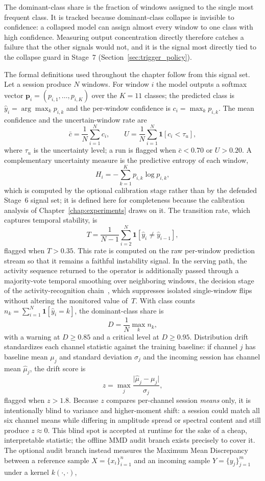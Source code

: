 The dominant-class share is the fraction of windows assigned to the single most frequent class. It is tracked because dominant-class collapse is invisible to confidence: a collapsed model can assign almost every window to one class with high confidence. Measuring output concentration directly therefore catches a failure that the other signals would not, and it is the signal most directly tied to the collapse guard in Stage~7 (Section~\ref{sec:trigger_policy}).

The formal definitions used throughout the chapter follow from this signal set. Let a session produce $N$ windows. For window $i$ the model outputs a softmax vector $\mathbf{p}_i=(p_{i,1},\dots,p_{i,K})$ over the $K=11$ classes; the predicted class is $\hat{y}_i=\arg\max_k p_{i,k}$ and the per-window confidence is $c_i=\max_k p_{i,k}$. The mean confidence and the uncertain-window rate are
\[
\bar{c}=\frac{1}{N}\sum_{i=1}^{N}c_i,
\qquad
U=\frac{1}{N}\sum_{i=1}^{N}\mathbf{1}\!\left[c_i<\tau_u\right],
\]
where $\tau_u$ is the uncertainty level; a run is flagged when $\bar{c}<0.70$ or $U>0.20$. A complementary uncertainty measure is the predictive entropy of each window,
\[
H_i=-\sum_{k=1}^{K}p_{i,k}\log p_{i,k},
\]
which is computed by the optional calibration stage rather than by the defended Stage~6 signal set; it is defined here for completeness because the calibration analysis of Chapter~\ref{chap:experiments} draws on it. The transition rate, which captures temporal stability, is
\[
T=\frac{1}{N-1}\sum_{i=2}^{N}\mathbf{1}\!\left[\hat{y}_i\neq\hat{y}_{i-1}\right],
\]
flagged when $T>0.35$. This rate is computed on the raw per-window prediction stream so that it remains a faithful instability signal. In the serving path, the activity sequence returned to the operator is additionally passed through a majority-vote temporal smoothing over neighboring windows, the decision stage of the activity-recognition chain~\cite{bulling2014tutorial,lester2006practical}, which suppresses isolated single-window flips without altering the monitored value of~$T$. With class counts $n_k=\sum_{i=1}^{N}\mathbf{1}[\hat{y}_i=k]$, the dominant-class share is
\[
D=\frac{1}{N}\max_{k}n_k,
\]
with a warning at $D\ge0.85$ and a critical level at $D\ge0.95$. Distribution drift standardizes each channel statistic against the training baseline: if channel $j$ has baseline mean $\mu_j$ and standard deviation $\sigma_j$ and the incoming session has channel mean $\hat{\mu}_j$, the drift score is
\[
z=\max_{j}\frac{\lvert \hat{\mu}_j-\mu_j\rvert}{\sigma_j},
\]
flagged when $z>1.8$. Because $z$ compares per-channel session \emph{means} only, it is intentionally blind to variance and higher-moment shift: a session could match all six channel means while differing in amplitude spread or spectral content and still produce $z\approx0$. This blind spot is accepted at runtime for the sake of a cheap, interpretable statistic; the offline MMD audit branch exists precisely to cover it. The optional audit branch instead measures the Maximum Mean Discrepancy between a reference sample $X=\{x_i\}_{i=1}^{n}$ and an incoming sample $Y=\{y_j\}_{j=1}^{m}$ under a kernel $k(\cdot,\cdot)$,
